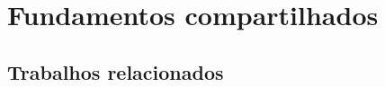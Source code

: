 \documentclass{beamer}
\begin{document}
\section[Fundamentos]{Fundamentos compartilhados}


\subsection{Trabalhos relacionados}
\end{document}
